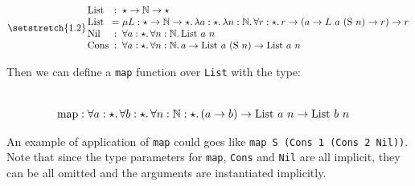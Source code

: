 \begin{equation*}
\setlength{\arraycolsep}{1.5pt}
\setstretch{1.2}
\begin{array}{lcl}
\List &:& \star \rightarrow \Nat \rightarrow \star \\
\List &=& \mu L : \star \rightarrow \Nat \rightarrow \star.\, \lambda a:\star.\, \lambda n :\Nat.\, \forall r:\star.\, r \rightarrow (a \rightarrow L~a~(\Succ ~ n) \rightarrow r) \rightarrow r \\
\Nil &:& \forall a : \star.\, \forall n : \Nat.\, \List ~ a ~ n \\
\Cons &:& \forall a : \star.\, \forall n : \Nat.\, a \rightarrow \List ~ a ~ (\Succ ~ n) \rightarrow \List ~ a ~n \\
\end{array}
\end{equation*}

\noindent Then we can define a \verb|map| function over \verb|List| with the type:

\begin{align*}
  \\
  & \mathrm{map} : \forall a : \star.\, \forall b : \star.\, \forall n : \mathbb{N} : \star.\, (a \rightarrow b) \rightarrow \mathrm{List}~a~n \rightarrow \mathrm{List}~b~n \\
\end{align*}

An example of application of \verb|map| could goes like \texttt{map S (Cons 1 (Cons 2 Nil))}.
Note that since the type parameters for \verb|map|, \verb|Cons| and \verb|Nil|
are all implicit, they can be all omitted
and the arguments are instantiated implicitly.

